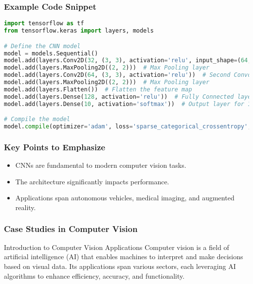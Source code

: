\documentclass[aspectratio=169]{beamer}
\begin{document}
\begin{frame}[fragile]
    \frametitle{Example Code Snippet}
    \begin{lstlisting}[language=Python]
import tensorflow as tf
from tensorflow.keras import layers, models

# Define the CNN model
model = models.Sequential()
model.add(layers.Conv2D(32, (3, 3), activation='relu', input_shape=(64, 64, 3)))  # First Convolutional Layer
model.add(layers.MaxPooling2D((2, 2)))  # Max Pooling layer
model.add(layers.Conv2D(64, (3, 3), activation='relu'))  # Second Convolutional Layer
model.add(layers.MaxPooling2D((2, 2)))  # Max Pooling layer
model.add(layers.Flatten())  # Flatten the feature map
model.add(layers.Dense(128, activation='relu'))  # Fully Connected layer
model.add(layers.Dense(10, activation='softmax'))  # Output layer for 10 classes

# Compile the model
model.compile(optimizer='adam', loss='sparse_categorical_crossentropy', metrics=['accuracy'])
    \end{lstlisting}
\end{frame}

\begin{frame}
    \frametitle{Key Points to Emphasize}
    \begin{itemize}
        \item CNNs are fundamental to modern computer vision tasks.
        \item The architecture significantly impacts performance.
        \item Applications span autonomous vehicles, medical imaging, and augmented reality.
    \end{itemize}
\end{frame}

\begin{frame}[fragile]
  \frametitle{Case Studies in Computer Vision}
  \begin{block}{Introduction to Computer Vision Applications}
    Computer vision is a field of artificial intelligence (AI) that enables machines to interpret and make decisions based on visual data. Its applications span various sectors, each leveraging AI algorithms to enhance efficiency, accuracy, and functionality.
  \end{block}
\end{frame}
\end{document}
